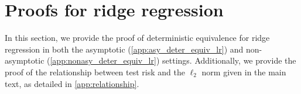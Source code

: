 \section{Proofs for ridge regression}

In this section, we provide the proof of deterministic equivalence for ridge regression in both the asymptotic (\cref{app:asy_deter_equiv_lr}) and non-asymptotic (\cref{app:nonasy_deter_equiv_lr}) settings. Additionally, we provide the proof of the relationship between test risk and the $\ell_2$ norm given in the main text, as detailed in \cref{app:relationship}.








